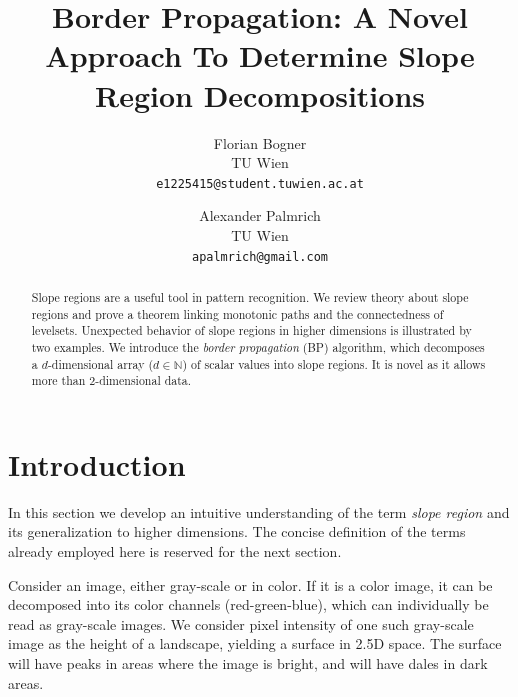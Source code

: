 \documentclass[11pt,twoside,twocolumn,a4paper]{article}
\theoremstyle{plain}
\theoremstyle{definition}
\begin{document}
\title{Border Propagation: A Novel Approach To Determine Slope Region Decompositions}


\author{Florian Bogner\\
TU Wien\\
{\tt\small e1225415@student.tuwien.ac.at}
\and
Alexander Palmrich\\
TU Wien\\
{\tt\small apalmrich@gmail.com}
}


\maketitle
\ifacvrwfinal\thispagestyle{fancy}\fi


\begin{abstract}
Slope regions are a useful tool in pattern recognition. We review theory about slope regions and prove a theorem linking monotonic paths and the connectedness of levelsets. Unexpected behavior of slope regions in higher dimensions is illustrated by two examples. We introduce the \emph{border propagation} (BP) algorithm, which decomposes a $d$-dimensional array ($d \in \mathbb N$) of scalar values into slope regions. It is novel as it allows more than 2-dimensional data.
\end{abstract}



\section{Introduction}
\label{sec:motivating_slope_regions}

In this section we develop an intuitive understanding of the term \emph{slope region} \cite{kropatsch2019computing} and its generalization to  higher dimensions.
The concise definition of the terms already employed here is reserved for the next section.

Consider an image, either gray-scale or in color.
If it is a color image, it can be decomposed into its color channels (red-green-blue), which can individually be read as gray-scale images.
We consider pixel intensity of one such gray-scale image as the height of a landscape, yielding a surface in 2.5D space.
The surface will have peaks in areas where the image is bright, and will have dales in dark areas.
\end{document}
